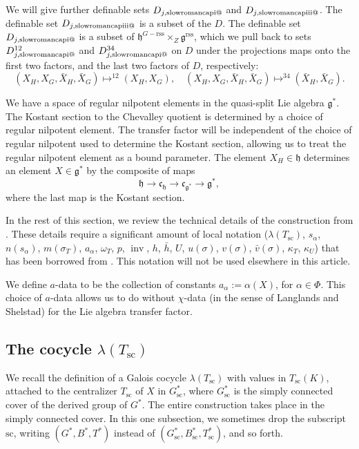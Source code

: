 \documentclass[12pt]{amsart}
\makeatletter
\newcommand*{\rom}[1]{\text{\expandafter\@slowromancap\romannumeral #1@}}
\newcommand{\op}[1]{\operatorname{#1}}
\newcommand{\fg}{\mathfrak{g}}
\newcommand{\fc}{\mathfrak{c}}
\newcommand{\fh}{\mathfrak{h}}
\newcommand{\reg}{\mathrm{rss}}
\theoremstyle{plain}
\theoremstyle{definition}
\makeatother
\begin{document}
We will give further definable sets $D_{j,{\rom{1}}}$ and
$D_{j,\rom{3}}$.  The definable set $D_{j,\rom{3}}$ is a subset of the
$D$.  The definable set
$D_{j,\rom{1}}$ is a subset of $\fh^{G-\reg}\times_Z\fg^\reg$, which
we pull back to sets $D^{12}_{j,\rom1}$ and $D^{34}_{j,\rom1}$ on
$D$ under the projections maps onto the first two
factors, and the last two factors of $D$,
respectively:
\[
(X_H,X_G,\bar X_H,\bar X_G)\mapsto^{12} (X_H,X_G),\quad
(X_H,X_G,\bar X_H,\bar X_G)\mapsto^{34} (\bar X_H,\bar X_G).
\]

We have a space of regular nilpotent elements in the quasi-split Lie
algebra $\fg^*$.  The Kostant section \cite{Kott} to the Chevalley
quotient is determined by a choice of regular nilpotent element.  The
transfer factor will be independent of the choice of regular nilpotent
used to determine the Kostant section, allowing us to treat the
regular nilpotent element as a bound parameter.  The element $X_H\in
\fh$ determines an element $X\in \fg^*$ by the composite of maps
\[
\fh \to \fc_{\fh} \to \fc_{\fg^*} \to \fg^*,
\]
where the last map is the Kostant section.  


In the rest of this section, we review the technical details of the
construction from \cite{LSxf}.  These details require a significant
amount of local notation ($\lambda(T_{\text{sc}})$, $s_\alpha$, $n(s_\alpha)$,
$m(\sigma_T)$, $a_\alpha$, $\omega_T$, $p$, $\op{inv}$, $h$, $\bar h$,
$U$, $u(\sigma)$, $v(\sigma)$, $\bar v(\sigma)$, $\kappa_T$,
$\kappa_U$) that has been borrowed from \cite{LSxf}.  This notation
will not be used elsewhere in this article.

We define $a$-data to be the collection of constants $a_\alpha:=
\alpha(X)$, for $\alpha\in \Phi$.  This choice of $a$-data allows us
to do without $\chi$-data (in the sense of Langlands and Shelstad) for
the Lie algebra transfer factor.



\subsection{The cocycle $\lambda(T_{\text{sc}})$}

We recall the definition of a Galois cocycle $\lambda(T_{\text{sc}})$ with
values in $T_{\text{sc}}(K)$, attached to the centralizer $T_{\text{sc}}$ of $X$ in
$G^*_{\text{sc}}$, where $G^*_{\text{sc}}$ is the simply connected cover of the
derived group of $G^*$.  The entire construction takes place in the
simply connected cover.  In this one subsection, we
sometimes drop the subscript ${\text{sc}}$, writing $(G^*,B^*,T^*)$ instead
of $(G^*_{\text{sc}},B^*_{\text{sc}},T^*_{\text{sc}})$, and so forth.
\end{document}
